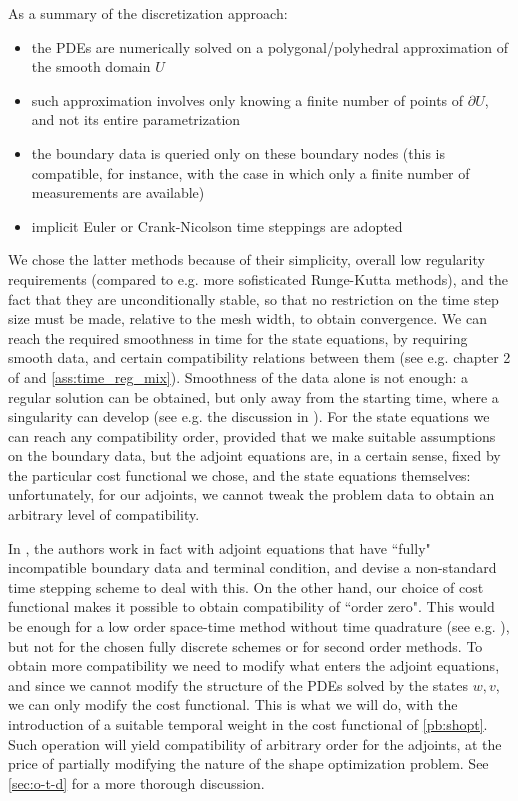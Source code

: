 \documentclass[english,a4paper,10pt,oneside]{scrbook}	%
\theoremstyle{break}
\theoremstyle{remark}
\begin{document}
As a summary of the discretization approach:

\begin{itemize}
	\item the PDEs are numerically solved on a polygonal/polyhedral approximation of the smooth domain $U$
	\item such approximation involves only knowing a finite number of points of $\partial U$, and not its entire parametrization
	\item the boundary data is queried only on these boundary nodes (this is compatible, for instance, with the case in which only a finite number of measurements are available)
	\item implicit Euler or Crank-Nicolson time steppings are adopted
\end{itemize}

We chose the latter methods because of their simplicity, overall low regularity requirements (compared to e.g. more sofisticated Runge-Kutta methods), and the fact that they are unconditionally stable, so that no restriction on the time step size must be made, relative to the mesh width, to obtain convergence. 
We can reach the required smoothness in time for the state equations, by requiring smooth data, and certain compatibility relations between them (see e.g. chapter 2 of \cite{lions} and \cref{ass:time_reg_mix}). Smoothness of the data alone is not enough: a regular solution can be obtained, but only away from the starting time, where a singularity can develop (see e.g. the discussion in \cite{harbrecht}). For the state equations we can reach any compatibility order, provided that we make suitable assumptions on the boundary data, but the adjoint equations are, in a certain sense, fixed by the particular cost functional we chose, and the state equations themselves: unfortunately, for our adjoints, we cannot tweak the problem data to obtain an arbitrary level of compatibility.

In \cite{harbrecht}, the authors work in fact with adjoint equations that have ``fully" incompatible boundary data and terminal condition, and devise a non-standard time stepping scheme to deal with this. On the other hand, our choice of cost functional makes it possible to obtain compatibility of ``order zero". This would be enough for a low order space-time method without time quadrature (see e.g. \cite{vexler}), but not for the chosen fully discrete schemes or for second order methods. To obtain more compatibility we need to modify what enters the adjoint equations, and since we cannot modify the structure of the PDEs solved by the states $w,v$, we can only modify the cost functional. This is what we will do, with the introduction of a suitable temporal weight in the cost functional of \cref{pb:shopt}. Such operation will yield compatibility of arbitrary order for the adjoints, at the price of partially modifying the nature of the shape optimization problem. See \cref{sec:o-t-d} for a more thorough discussion.
\end{document}

